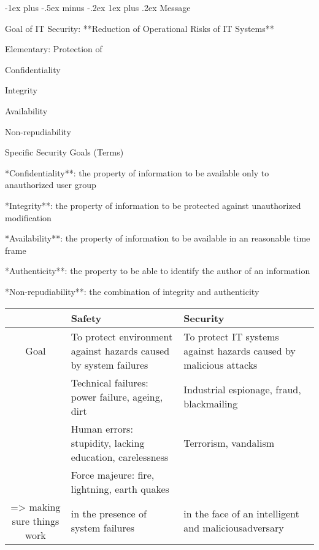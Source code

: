 \documentclass[a4paper]{article}
\makeatletter
\renewcommand{\subsubsection}{\@startsection{subsubsection}{3}{0mm}%
                                {-1ex plus -.5ex minus -.2ex}%
                                {1ex plus .2ex}%
                                {\normalfont\small\bfseries}}
\makeatother
\begin{document}
\begin{multicols}{3}
    \subsubsection{Message}
    \begin{itemize*}
        \item Goal of IT Security: **Reduction of Operational Risks of IT Systems**
        \item Elementary: Protection of
              \begin{itemize*}
                  \item Confidentiality
                  \item Integrity
                  \item Availability
                  \item Non-repudiability
              \end{itemize*}
    \end{itemize*}

    Specific Security Goals (Terms)
    \begin{itemize*}
        \item **Confidentiality**: the property of information to be available only to anauthorized user group
        \item **Integrity**: the property of information to be protected against unauthorized modification
        \item **Availability**: the property of information to be available in an reasonable time frame
        \item **Authenticity**: the property to be able to identify the author of an information
        \item **Non-repudiability**: the combination of integrity and authenticity
    \end{itemize*}

    \begin{tabular}{c| l | l}
                                   & Safety                                                           & Security                                                          \\\hline
        Goal                       & To protect environment against hazards caused by system failures & To protect IT systems against hazards caused by malicious attacks \\
                                   & Technical failures: power failure, ageing, dirt                  & Industrial espionage, fraud, blackmailing                         \\
                                   & Human errors: stupidity, lacking education, carelessness         & Terrorism, vandalism                                              \\
                                   & Force majeure: fire, lightning, earth quakes                     &                                                                   \\
        => making sure things work & in the presence of system failures                               & in the face of an intelligent and maliciousadversary
    \end{tabular}


\end{multicols}
\end{document}
